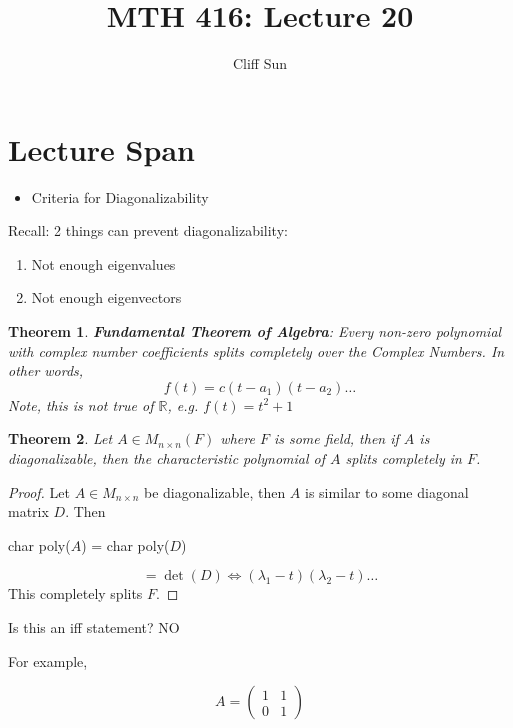\documentclass{article}
\title{MTH 416: Lecture 20}
\author{Cliff Sun}
\newtheorem{theorem}{Theorem}[section]
\newtheorem{one minute paper}[theorem]{One Minute Paper}
\begin{document}
\maketitle

\section*{Lecture Span}
\begin{itemize}
    \item Criteria for Diagonalizability
\end{itemize}

Recall: 2 things can prevent diagonalizability:
\begin{enumerate}
    \item Not enough eigenvalues
    \item Not enough eigenvectors
\end{enumerate}

\begin{theorem}
    \textbf{Fundamental Theorem of Algebra}: Every non-zero polynomial with complex number coefficients splits completely over the 
    Complex Numbers. In other words, 
    \begin{equation}
        f(t) = c(t-a_1)(t-a_2)\dots
    \end{equation}
    Note, this is not true of $\mathbb{R}$, e.g. $f(t) = t^2 + 1$
\end{theorem}

\begin{theorem}
    Let $A \in M_{n \times n}(F)$ where $F$ is some field, then if $A$ is diagonalizable, then the characteristic polynomial of $A$ splits completely in $F$. 
\end{theorem}

\begin{proof}
    Let $A \in M_{n \times n}$ be diagonalizable, then $A$ is similar to some diagonal matrix $D$. Then 
    \begin{center}
        char poly($A$) = char poly($D$)
    \end{center}
    \begin{equation}
        = \det(D) \iff (\lambda_1 - t)(\lambda_2 - t)\dots
    \end{equation}
    This completely splits $F$. 
\end{proof}

Is this an iff statement? NO

For example, 

\begin{equation}
    A = \begin{pmatrix}
        1 & 1 \\
        0 & 1
    \end{pmatrix}
\end{equation}
\end{document}
